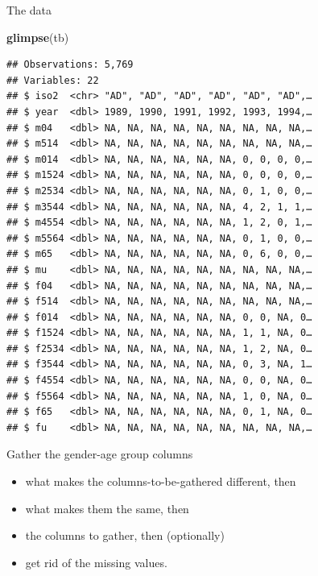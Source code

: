 \documentclass[ignorenonframetext,]{beamer}
\newenvironment{Shaded}{\begin{snugshade}}{\end{snugshade}}
\newcommand{\DataTypeTok}[1]{\textcolor[rgb]{0.13,0.29,0.53}{#1}}
\newcommand{\KeywordTok}[1]{\textcolor[rgb]{0.13,0.29,0.53}{\textbf{#1}}}
\newcommand{\NormalTok}[1]{#1}
\newcommand{\OperatorTok}[1]{\textcolor[rgb]{0.81,0.36,0.00}{\textbf{#1}}}
\newcommand{\StringTok}[1]{\textcolor[rgb]{0.31,0.60,0.02}{#1}}
\providecommand{\tightlist}{%
  \setlength{\itemsep}{0pt}\setlength{\parskip}{0pt}}
\begin{document}
\begin{frame}[fragile]{The data}
\protect\hypertarget{the-data-4}{}

\begin{Shaded}
\begin{Highlighting}[]
\KeywordTok{glimpse}\NormalTok{(tb)}
\end{Highlighting}
\end{Shaded}

\begin{verbatim}
## Observations: 5,769
## Variables: 22
## $ iso2  <chr> "AD", "AD", "AD", "AD", "AD", "AD",…
## $ year  <dbl> 1989, 1990, 1991, 1992, 1993, 1994,…
## $ m04   <dbl> NA, NA, NA, NA, NA, NA, NA, NA, NA,…
## $ m514  <dbl> NA, NA, NA, NA, NA, NA, NA, NA, NA,…
## $ m014  <dbl> NA, NA, NA, NA, NA, NA, 0, 0, 0, 0,…
## $ m1524 <dbl> NA, NA, NA, NA, NA, NA, 0, 0, 0, 0,…
## $ m2534 <dbl> NA, NA, NA, NA, NA, NA, 0, 1, 0, 0,…
## $ m3544 <dbl> NA, NA, NA, NA, NA, NA, 4, 2, 1, 1,…
## $ m4554 <dbl> NA, NA, NA, NA, NA, NA, 1, 2, 0, 1,…
## $ m5564 <dbl> NA, NA, NA, NA, NA, NA, 0, 1, 0, 0,…
## $ m65   <dbl> NA, NA, NA, NA, NA, NA, 0, 6, 0, 0,…
## $ mu    <dbl> NA, NA, NA, NA, NA, NA, NA, NA, NA,…
## $ f04   <dbl> NA, NA, NA, NA, NA, NA, NA, NA, NA,…
## $ f514  <dbl> NA, NA, NA, NA, NA, NA, NA, NA, NA,…
## $ f014  <dbl> NA, NA, NA, NA, NA, NA, 0, 0, NA, 0…
## $ f1524 <dbl> NA, NA, NA, NA, NA, NA, 1, 1, NA, 0…
## $ f2534 <dbl> NA, NA, NA, NA, NA, NA, 1, 2, NA, 0…
## $ f3544 <dbl> NA, NA, NA, NA, NA, NA, 0, 3, NA, 1…
## $ f4554 <dbl> NA, NA, NA, NA, NA, NA, 0, 0, NA, 0…
## $ f5564 <dbl> NA, NA, NA, NA, NA, NA, 1, 0, NA, 0…
## $ f65   <dbl> NA, NA, NA, NA, NA, NA, 0, 1, NA, 0…
## $ fu    <dbl> NA, NA, NA, NA, NA, NA, NA, NA, NA,…
\end{verbatim}

\end{frame}

\begin{frame}[fragile]{Gather the gender-age group columns}
\protect\hypertarget{gather-the-gender-age-group-columns}{}

\begin{Shaded}
\end{Shaded}

\begin{itemize}
\tightlist
\item
  what makes the columns-to-be-gathered different, then
\item
  what makes them the same, then
\item
  the columns to gather, then (optionally)
\item
  get rid of the missing values.
\end{itemize}

\end{frame}
\end{document}
